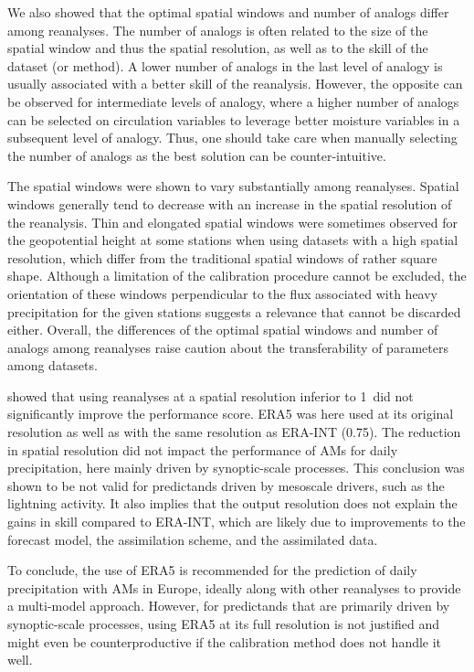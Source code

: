 \documentclass[alpha-refs]{wiley-article}
\begin{document}
We also showed that the optimal spatial windows and number of analogs differ among reanalyses. The number of analogs is often related to the size of the spatial window and thus the spatial resolution, as well as to the skill of the dataset (or method). A lower number of analogs in the last level of analogy is usually associated with a better skill of the reanalysis. However, the opposite can be observed for intermediate levels of analogy, where a higher number of analogs can be selected on circulation variables to leverage better moisture variables in a subsequent level of analogy. Thus, one should take care when manually selecting the number of analogs as the best solution can be counter-intuitive.

The spatial windows were shown to vary substantially among reanalyses. Spatial windows generally tend to decrease with an increase in the spatial resolution of the reanalysis. Thin and elongated spatial windows were sometimes observed for the geopotential height at some stations when using datasets with a high spatial resolution, which differ from the traditional spatial windows of rather square shape. Although a limitation of the calibration procedure cannot be excluded, the orientation of these windows perpendicular to the flux associated with heavy precipitation for the given stations suggests a relevance that cannot be discarded either. Overall, the differences of the optimal spatial windows and number of analogs among reanalyses raise caution about the transferability of parameters among datasets.

\citet{Horton2018b} showed that using reanalyses at a spatial resolution inferior to  1\degree\ did not significantly improve the performance score. ERA5 was here used at its original resolution as well as with the same resolution as ERA-INT (0.75\degree). The reduction in spatial resolution did not impact the performance of AMs for daily precipitation, here mainly driven by synoptic-scale processes. This conclusion was shown to be not valid for predictands driven by mesoscale drivers, such as the lightning activity. It also implies that the output resolution does not explain the gains in skill compared to ERA-INT, which are likely due to improvements to the forecast model, the assimilation scheme, and the assimilated data.

To conclude, the use of ERA5 is recommended for the prediction of daily precipitation with AMs in Europe, ideally along with other reanalyses to provide a multi-model approach. However, for predictands that are primarily driven by synoptic-scale processes, using ERA5 at its full resolution is not justified and might even be counterproductive if the calibration method does not handle it well.
\end{document}
